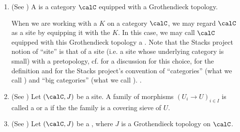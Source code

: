 \begin{definition}
\begin{enumerate}
        Some will refer to a Grothendieck topology as simply a , not to be confused with the related, but less general, notion of a .


        \item (See \cite[Expos\'e II, 1.1.5]{SGA4_I}) A  is a category $\calC$ equipped with a Grothendieck topology.

        When we are working with a  $K$ on a category $\calC$, we may regard $\calC$ as a site by equipping it with the  $K$. In this case, we may call $\calC$ equipped with this Grothendieck topology a . Note that the Stacks project notion of ``site'' is that of a  site (i.e. a site whose underlying category is small) with a pretopology, cf. \cite[Tag 00V0]{stacks-project} for a discussion for this choice, \cite[Tag 00VH]{stacks-project} for the definition and \cite[Tags 0005 and 0015]{stacks-project} for the Stacks project's convention of ``categories'' (what we call ) and ``big categories'' (what we call ). .

        \item (See \cite[Expos\'e II, D\'efinition 1.2]{SGA4_I}) Let $(\calC, J)$ be a site. A family of morphisms $(U_i \to U)_{i \in I}$ is called a  or a  if the  the family is a covering sieve of $U$. 

        \item (See \cite[Expos\'e II, D\'efinition 3.0.1]{SGA4_I}) Let $(\calC, J)$ be a , where $J$ is a Grothendieck topology on $\calC$.


\end{enumerate}
\end{definition}
